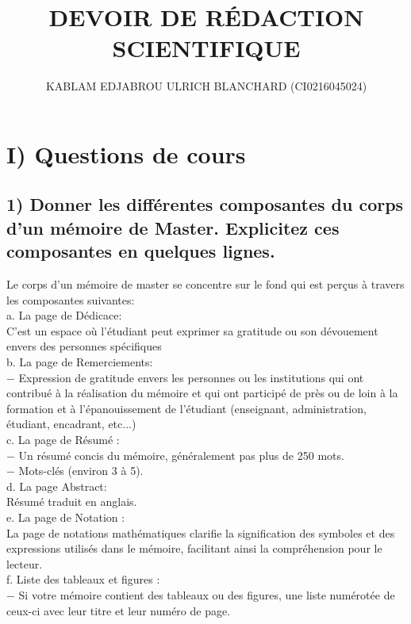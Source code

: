 \documentclass[12pt, a4paper, oneside]{book}
\title{DEVOIR DE RÉDACTION SCIENTIFIQUE}
\author{KABLAM EDJABROU ULRICH BLANCHARD (CI0216045024)}
\begin{document}
	\maketitle
	\newpage
	\section*{I) Questions de cours}
	\subsection*{1) Donner les différentes composantes du corps d'un mémoire de Master. Explicitez ces composantes en quelques lignes.}

	Le corps d'un mémoire de master se concentre sur le fond qui est perçus à travers les composantes suivantes:\\

	
	a. La page de Dédicace:\\
	C'est un espace où l'étudiant peut exprimer sa gratitude ou son dévouement envers des personnes spécifiques \\
	
	b. La page de Remerciements:\\
	$-$ Expression de gratitude envers les personnes ou les institutions qui ont contribué à la réalisation du mémoire et qui ont participé de près ou de loin à la formation et à l'épanouissement de l'étudiant (enseignant, administration, étudiant, encadrant, etc...)\\
	
	c. La page de Résumé :\\
	$-$ Un résumé concis du mémoire, généralement pas plus de 250 mots.\\
	$-$ Mots-clés (environ 3 à 5).\\
	
	d. La page Abstract:\\
	Résumé traduit en anglais.\\
	
	e. La page de Notation :\\
	La page de notations mathématiques clarifie la signification des symboles et des expressions utilisés dans le mémoire, facilitant ainsi la compréhension pour le lecteur.\\
	
	f. Liste des tableaux et figures :\\
$-$ Si votre mémoire contient des tableaux ou des figures, une liste numérotée de ceux-ci avec leur titre et leur numéro de page.\\
	
\end{document}
